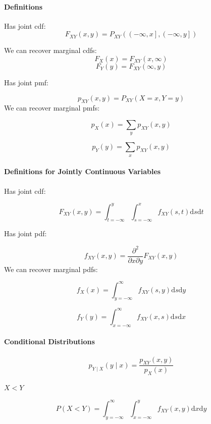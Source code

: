 \documentclass[twocolumn,english]{article}
\begin{document}
\paragraph{Definitions}

Has joint cdf:
\[
F_{XY}\left(x,y\right)=P_{XY}\left(\left(-\infty,x\right],\left(-\infty,y\right]\right)
\]

We can recover marginal cdfs:
\[
F_{X}\left(x\right)=F_{XY}\left(x,\infty\right)
\]
\[
F_{Y}\left(y\right)=F_{XY}\left(\infty,y\right)
\]

Has joint pmf:

\[
p_{XY}\left(x,y\right)=P_{XY}\left(X=x,Y=y\right)
\]
We can recover marginal pmfs:

\[
p_{X}\left(x\right)=\sum_{y}p_{XY}\left(x,y\right)
\]

\[
p_{Y}\left(y\right)=\sum_{x}p_{XY}\left(x,y\right)
\]

\paragraph{Definitions for Jointly Continuous Variables}

Has joint cdf:

\[
F_{XY}\left(x,y\right)=\int_{t=-\infty}^{y}\int_{s=-\infty}^{x}f_{XY}\left(s,t\right)\text{d}s\text{d}t
\]

Has joint pdf:

\[
f_{XY}\left(x,y\right)=\frac{\partial^{2}}{\partial x\partial y}F_{XY}\left(x,y\right)
\]
We can recover marginal pdfs:

\[
f_{X}\left(x\right)=\int_{y=-\infty}^{\infty}f_{XY}\left(s,y\right)\text{d}s\text{d}y
\]

\[
f_{Y}\left(y\right)=\int_{x=-\infty}^{\infty}f_{XY}\left(x,s\right)\text{d}s\text{d}x
\]

\paragraph{Conditional Distributions}

\[
p_{Y\mid X}\left(y\mid x\right)=\frac{p_{XY}\left(x,y\right)}{p_{X}\left(x\right)}
\]

\paragraph{$X<Y$}

\[
P\left(X<Y\right)=\int_{y=-\infty}^{\infty}\int_{x=-\infty}^{y}f_{XY}\left(x,y\right)\text{d}x\text{d}y
\]
\end{document}

